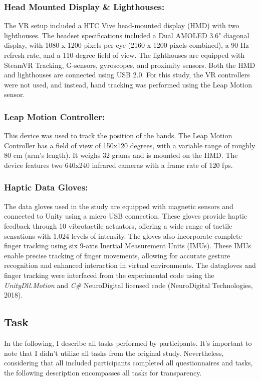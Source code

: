 \documentclass[12pt,oneside,openright]{report}
\begin{document}
\subsubsection*{Head Mounted Display \& Lighthouses:}
The VR setup included a HTC Vive head-mounted display (HMD) with two lighthouses. The headset specifications included a Dual AMOLED 3.6" diagonal display, with 1080 x 1200 pixels per eye (2160 x 1200 pixels combined), a 90 Hz refresh rate, and a 110-degree field of view. The lighthouses are equipped with SteamVR Tracking, G-sensors, gyroscopes, and proximity sensors. Both the HMD and lighthouses are connected using USB 2.0. For this study, the VR controllers were not used, and instead, hand tracking was performed using the Leap Motion sensor.

\subsubsection*{Leap Motion Controller:}
This device was used to track the position of the hands. The Leap Motion Controller has a field of view of 150x120 degrees, with a variable range of roughly 80 cm (arm's length). It weighs 32 grams and is mounted on the HMD. The device features two 640x240 infrared cameras with a frame rate of 120 fps.

\subsubsection*{Haptic Data Gloves:}
The data gloves used in the study are equipped with magnetic sensors and connected to Unity using a micro USB connection. These gloves provide haptic feedback through 10 vibrotactile actuators, offering a wide range of tactile sensations with 1,024 levels of intensity. The gloves also incorporate complete finger tracking using six 9-axis Inertial Measurement Units (IMUs). These IMUs enable precise tracking of finger movements, allowing for accurate gesture recognition and enhanced interaction in virtual environments. The datagloves and finger tracking were interfaced from the experimental code using the \textit{UnityDll.Motion} and \textit{C\#} NeuroDigital licensed code (NeuroDigital Technologies, 2018).


\subsection*{Task}

In the following, I describe all tasks performed by participants. It's important to note that I didn't utilize all tasks from the original study. Nevertheless, considering that all included participants completed all questionnaires and tasks, the following description encompasses all tasks for transparency.
\end{document}
